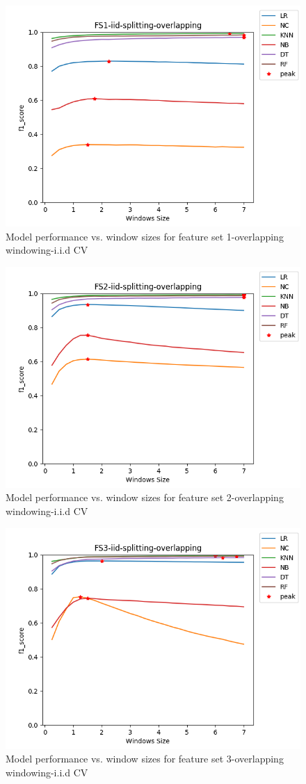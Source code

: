

\begin{figure}[h]
    \centering
    \includegraphics[width=.5\textwidth]{Figures/FS1-iid-splitting-overlapping.png}
    \caption{Model performance vs. window sizes for feature set 1-overlapping windowing-i.i.d CV}
    \label{fig:iid-over-fs1}
\end{figure}

\begin{figure}[h]
    \centering
    \includegraphics[width=.5\textwidth]{Figures/FS2-iid-splitting-overlapping.png}
   
    \caption{Model performance vs. window sizes for feature set 2-overlapping windowing-i.i.d CV}
    \label{fig:iid-over-fs2}
\end{figure}

\begin{figure}[h]
    \centering
    \includegraphics[width=.5\textwidth]{Figures/FS3-iid-splitting-overlapping.png}
    \caption{Model performance vs. window sizes for feature set 3-overlapping windowing-i.i.d CV}
    \label{fig:iid-over-fs3}
\end{figure}


